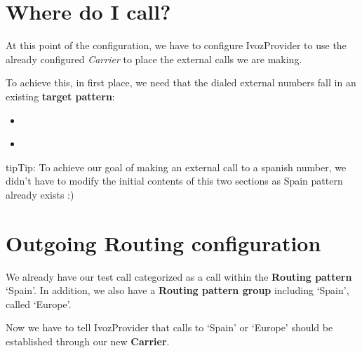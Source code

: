 \documentclass[letterpaper,10pt,english]{sphinxmanual}
\begin{document}
\section{Where do I call?}
\label{getting_started/external_outgoing_calls/where_do_i_call::doc}\label{getting_started/external_outgoing_calls/where_do_i_call:where-do-i-call}
At this point of the configuration, we have to configure IvozProvider to use the
already configured \emph{Carrier} to place the external calls we are making.

To achieve this, in first place, we need that the dialed external numbers fall
in an existing \textbf{target pattern}:
\begin{itemize}
\item {} 
{\hyperref[administration_portal/brand/routing/routing_patterns:id1]{}}

\item {} 
{\hyperref[administration_portal/brand/routing/routing_patterns_groups:routing\string-pattern\string-groups]{}}

\end{itemize}

\begin{notice}{tip}{Tip:}
To achieve our goal of making an external call to a spanish number, we didn't have
to modify the initial contents of this two sections as Spain pattern already exists :)
\end{notice}


\section{Outgoing Routing configuration}
\label{getting_started/external_outgoing_calls/call_routing:outgoing-routing-configuration}\label{getting_started/external_outgoing_calls/call_routing::doc}
We already have our test call categorized as a call within the \textbf{Routing pattern}
`Spain'. In addition, we also have a \textbf{Routing pattern group} including `Spain',
called `Europe'.

Now we have to tell IvozProvider that calls to `Spain' or `Europe' should be
established through our new \textbf{Carrier}.
\end{document}

